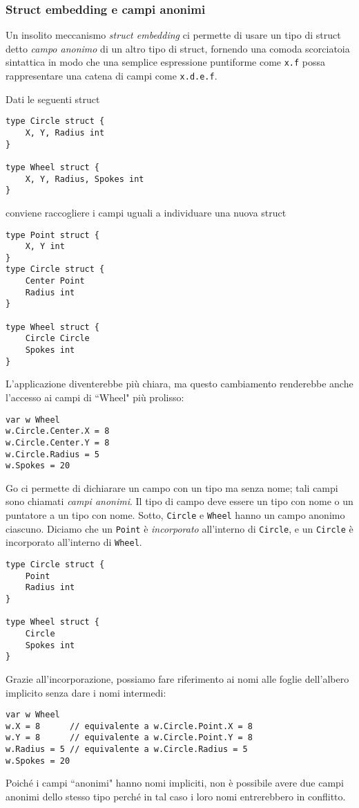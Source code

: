 \documentclass[../../../thesis.tex]{subfiles}
\begin{document}
    \subsubsection{Struct embedding e campi anonimi}
    Un insolito meccanismo \textit{struct embedding} ci permette di usare un tipo di struct detto \textit{campo anonimo} di un altro tipo di struct, fornendo una comoda scorciatoia sintattica in modo che una semplice espressione puntiforme come \verb"x.f" possa rappresentare una catena di campi come \verb"x.d.e.f".
    \hfill \vspace{12pt}

    Dati le seguenti struct
    \begin{lstlisting}[frame = single,label={lst:lstlisting3-4-3.1}]
type Circle struct {
    X, Y, Radius int
}

type Wheel struct {
    X, Y, Radius, Spokes int
}
    \end{lstlisting}
    conviene raccogliere i campi uguali a individuare una nuova struct
    \begin{lstlisting}[frame = single,label={lst:lstlisting3-4-3.2}]
type Point struct {
    X, Y int
}
type Circle struct {
    Center Point
    Radius int
}

type Wheel struct {
    Circle Circle
    Spokes int
}
    \end{lstlisting}
    L'applicazione diventerebbe più chiara, ma questo cambiamento renderebbe anche l'accesso ai campi di ``Wheel" più prolisso:
    \begin{lstlisting}[frame = single,label={lst:lstlisting3-4-3.3}]
var w Wheel
w.Circle.Center.X = 8
w.Circle.Center.Y = 8
w.Circle.Radius = 5
w.Spokes = 20
    \end{lstlisting}
    Go ci permette di dichiarare un campo con un tipo ma senza nome;
    tali campi sono chiamati \textit{campi anonimi}.
    Il tipo di campo deve essere un tipo con nome o un puntatore a un tipo con nome.
    Sotto, \verb"Circle" e \verb"Wheel" hanno un campo anonimo ciascuno.
    Diciamo che un \verb"Point" è \textit{incorporato} all'interno di \verb"Circle", e un \verb"Circle" è incorporato all'interno di \verb"Wheel".
    \begin{lstlisting}[frame = single,label={lst:lstlisting3-4-3.4}]
type Circle struct {
    Point
    Radius int
}

type Wheel struct {
    Circle
    Spokes int
}
    \end{lstlisting}
    Grazie all'incorporazione, possiamo fare riferimento ai nomi alle foglie dell'albero implicito senza dare i nomi intermedi:
    \begin{lstlisting}[frame = single,label={lst:lstlisting3-4-3.5}]
var w Wheel
w.X = 8	     // equivalente a w.Circle.Point.X = 8
w.Y = 8	     // equivalente a w.Circle.Point.Y = 8
w.Radius = 5 // equivalente a w.Circle.Radius = 5
w.Spokes = 20
    \end{lstlisting}
    Poiché i campi ``anonimi" hanno nomi impliciti, non è possibile avere due campi anonimi dello stesso tipo perché in tal caso i loro nomi entrerebbero in conflitto.
    \hfill \vspace{12pt}
\end{document}
